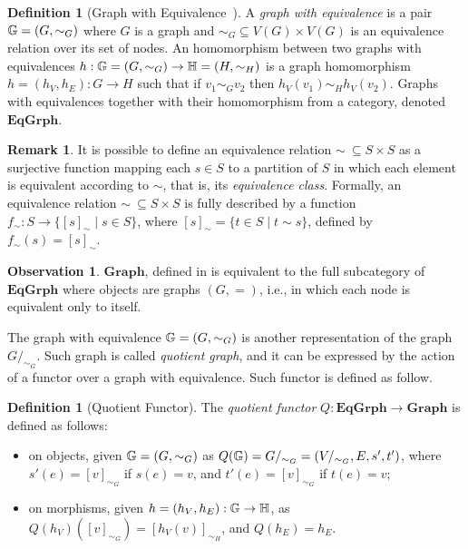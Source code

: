 \documentclass[a4paper, twoside,openright]{report}
\theoremstyle{plain}
\theoremstyle{definition}
\newtheorem{definition}[theorem]{Definition}
\newtheorem{remark}[theorem]{Remark}
\newtheorem{obs}[theorem]{Observation}
\begin{document}
\begin{definition}[Graph with Equivalence~\cite{concur2006}]
    A \emph{graph with equivalence} is a pair $\mathbb{G} = (G, \sim_G)$ where $G$ is a graph and $\sim_G \subseteq V(G)\times V(G)$ is an equivalence relation over its set of nodes. An homomorphism between two graphs with equivalences $h :\mathbb{G} = (G, \sim_G)\rightarrow \mathbb{H} = (H, \sim_H)$ is a graph homomorphism $h = (h_V, h_E):G \rightarrow H$ such that if $v_1 \sim_G v_2$ then $h_V(v_1) \sim_H h_V(v_2)$. Graphs with equivalences together with their homomorphism from a category, denoted $\mathbf{EqGrph}$.
\end{definition}

\begin{remark}\label{rem:eq_as_surj}
    It is possible to define an equivalence relation $\sim \ \subseteq S\times S$ as a surjective function mapping each $s \in S$ to a partition of $S$ in which each element is equivalent according to $\sim$, that is, its \emph{equivalence class}. Formally, an equivalence relation $\sim \ \subseteq S\times S$ is fully described by a function $f_\sim : S \rightarrow \{[s]_\sim \mid s \in S \}$, where $[s]_\sim = \{t \in S \mid t \sim s\}$, defined by $f_{\sim}(s) = [s]_\sim$. 
\end{remark}

\begin{obs}
    $\mathbf{Graph}$, defined in  is equivalent to the full subcategory of $\mathbf{EqGrph}$ where objects are graphs $(G, =)$, i.e., in which each node is equivalent only to itself.
\end{obs}


The graph with equivalence $\mathbb{G} = (G, \sim_G)$ is another representation of the graph $G/_{\sim_G}$. Such graph is called \emph{quotient graph}, and it can be expressed by the action of a functor over a graph with equivalence. Such functor is defined as follow.

\begin{definition}[Quotient Functor]\label{def:quot_func}
    The \emph{quotient functor} $Q: \mathbf{EqGrph} \rightarrow \mathbf{Graph}$ is defined as follows:
    \begin{itemize}
        \item on objects, given $\mathbb{G}=(G, \sim_{G})$ as $Q(\mathbb{G}) = G/_{\sim_G} = (V/_{\sim_G}, E, s', t')$, where $s'(e) = [v]_{\sim_G}$ if $s(e) = v$, and $t'(e) = [v]_{\sim_G}$ if $t(e) = v$;
        \item on morphisms, given $h = (h_V, h_E): \mathbb{G \rightarrow H}$, as $Q(h_V)([v]_{\sim_G}) = [h_V(v)]_{\sim_H}$, and $Q(h_E) = h_E$.
    \end{itemize}
\end{definition}
\end{document}
